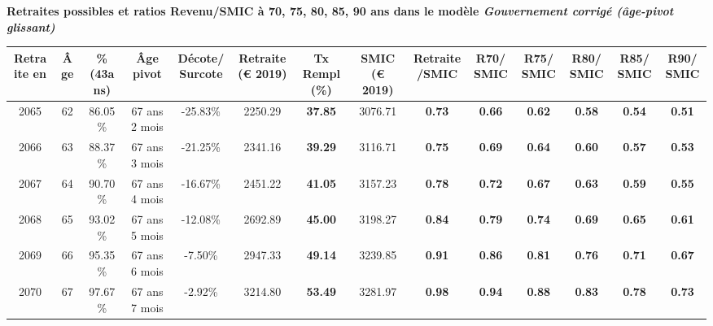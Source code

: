  \vspace{0.1cm} 
{\bf \noindent Retraites possibles et ratios Revenu/SMIC à 70, 75, 80, 85, 90 ans dans le modèle \emph{Gouvernement corrigé (âge-pivot glissant)}}  
 
\begin{adjustbox}{max width=\textwidth} 
\begin{tabular}[htb]{|c|c||c|c|c||c|c||c|c||c|c|c|c|c|} 
\hline 
 Retraite en &  Âge &  \%(43ans) &  Âge pivot &  Décote/Surcote &  Retraite (\euro{} 2019) &  Tx Rempl(\%) &  SMIC (\euro{} 2019) &  Retraite/SMIC &  R70/SMIC &  R75/SMIC &  R80/SMIC &  R85/SMIC &  R90/SMIC \\ 
\hline \hline 
 2065 &  62 &  86.05\% &  67 ans 2 mois &  -25.83\% &  2250.29 &  {\bf 37.85} &  3076.71 &  {\bf {\color{red} 0.73}} &  {\bf {\color{red} 0.66}} &  {\bf {\color{red} 0.62}} &  {\bf {\color{red} 0.58}} &  {\bf {\color{red} 0.54}} &  {\bf {\color{red} 0.51}} \\ 
\hline 
 2066 &  63 &  88.37\% &  67 ans 3 mois &  -21.25\% &  2341.16 &  {\bf 39.29} &  3116.71 &  {\bf {\color{red} 0.75}} &  {\bf {\color{red} 0.69}} &  {\bf {\color{red} 0.64}} &  {\bf {\color{red} 0.60}} &  {\bf {\color{red} 0.57}} &  {\bf {\color{red} 0.53}} \\ 
\hline 
 2067 &  64 &  90.70\% &  67 ans 4 mois &  -16.67\% &  2451.22 &  {\bf 41.05} &  3157.23 &  {\bf {\color{red} 0.78}} &  {\bf {\color{red} 0.72}} &  {\bf {\color{red} 0.67}} &  {\bf {\color{red} 0.63}} &  {\bf {\color{red} 0.59}} &  {\bf {\color{red} 0.55}} \\ 
\hline 
 2068 &  65 &  93.02\% &  67 ans 5 mois &  -12.08\% &  2692.89 &  {\bf 45.00} &  3198.27 &  {\bf {\color{red} 0.84}} &  {\bf {\color{red} 0.79}} &  {\bf {\color{red} 0.74}} &  {\bf {\color{red} 0.69}} &  {\bf {\color{red} 0.65}} &  {\bf {\color{red} 0.61}} \\ 
\hline 
 2069 &  66 &  95.35\% &  67 ans 6 mois &  -7.50\% &  2947.33 &  {\bf 49.14} &  3239.85 &  {\bf {\color{red} 0.91}} &  {\bf {\color{red} 0.86}} &  {\bf {\color{red} 0.81}} &  {\bf {\color{red} 0.76}} &  {\bf {\color{red} 0.71}} &  {\bf {\color{red} 0.67}} \\ 
\hline 
 2070 &  67 &  97.67\% &  67 ans 7 mois &  -2.92\% &  3214.80 &  {\bf 53.49} &  3281.97 &  {\bf {\color{red} 0.98}} &  {\bf {\color{red} 0.94}} &  {\bf {\color{red} 0.88}} &  {\bf {\color{red} 0.83}} &  {\bf {\color{red} 0.78}} &  {\bf {\color{red} 0.73}} \\ 
\hline 
\hline 
\end{tabular} 
\end{adjustbox} 
 

